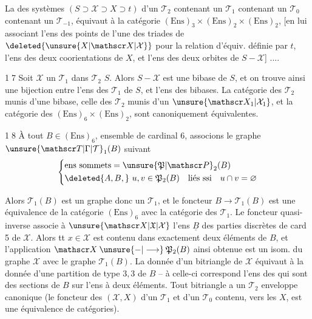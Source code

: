  La   des systèmes $(S\supset\mathscr X\supset X\supset t)$ d'un $\mathscr T_2$ contenant un $\mathscr T_1$ contenant un $\mathscr T_0$ contenant un $\mathscr T_{-1}$, équivaut à la catégorie $(\mathrm{Ens})_3\times(\mathrm{Ens})_2\times(\mathrm{Ens})_2$, [en lui associant l'ens des points de l'une des triades de $\deleted{\unsure{X|\mathscr X|\mathcal X}}$ pour la relation d'équiv. définie par $t$, l'ens des deux coorientations de $X$, et l'ens des deux orbites de $S-\mathscr X$] ....

\textcircled{17} Soit $\mathscr X$ un $\mathscr T_1$ dans  $\mathscr T_2$ $S$. Alors $S-\mathscr X$ est une bibase de $S$, et on trouve ainsi une bijection entre l'ens des $\mathscr T_1$ de $S$, et l'ens des bibases.
La catégorie des $\mathscr T_2$ munis d'une bibase, celle des $\mathscr T_2$ munis d'un $\unsure{\mathscr X_1|\mathcal X_1}$, et la catégorie des $(\mathrm{Ens})_6\times(\mathrm{Ens})_2$, sont canoniquement équivalentes.


\textcircled{18} À tout $B\in(\mathrm{Ens})_6$, ensemble de cardinal 6, associons le graphe $\unsure{\mathscr T|\Gamma|\mathcal T}_1(B)$ suivant
\[
\left\{\begin{aligned}
&\text{ens sommets}=\unsure{\mathfrak P|\mathscr P}_2(B)\\
&\deleted{A,B,}\ u,v\in\mathfrak P_2(B)\quad\text{liés ssi}\quad u\cap v=\varnothing
\end{aligned}\right.
\]

Alors $\mathscr T_1(B)$ est un graphe  donc un $\mathscr T_1$, et le foncteur $B\longrightarrow\mathscr T_1(B)$ est une équivalence de la catégorie $(\mathrm{Ens})_6$ avec la catégorie des $\mathscr T_1$. Le foncteur quasi-inverse associe à $\unsure{\mathscr X|\mathfrak X|\mathcal X}$ l'ens $\underline{B}$ des parties discrètes de card 5 de $\mathscr X$.
Alors tt $x\in\mathscr X$ est contenu dans exactement deux éléments de $B$, et l'application $\mathscr X\mathbin{\unsure{-|\longrightarrow}}\mathfrak P_2(B)$ ainsi obtenue est un isom. du graphe $\mathscr X$ avec le graphe $\mathscr T_1(B)$.
La donnée d'un bitriangle de $\mathscr X$ équivaut à la donnée d'une partition de type $3,3$ de $B$ -- à celle-ci correspond l'ens des   qui sont des sections de $B$ sur l'ens  à deux éléments.
Tout bitriangle a un $\mathscr T_2$ enveloppe canonique (le foncteur des $(\mathscr X,X)$ d'un $\mathscr T_1$ et d'un $\mathscr T_0$ contenu, vers les $X$, est une équivalence de catégories).

